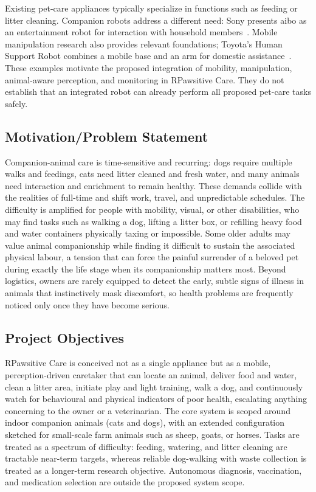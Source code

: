 \documentclass[conference,letterpaper]{IEEEtran}
\begin{document}
Existing pet-care appliances typically specialize in functions such as feeding or litter cleaning. Companion robots address a different need: Sony presents aibo as an entertainment robot for interaction with household members~\cite{sony}. Mobile manipulation research also provides relevant foundations; Toyota's Human Support Robot combines a mobile base and an arm for domestic assistance~\cite{toyota}. These examples motivate the proposed integration of mobility, manipulation, animal-aware perception, and monitoring in RPawsitive Care. They do not establish that an integrated robot can already perform all proposed pet-care tasks safely.

\subsection{Motivation/Problem Statement}

Companion-animal care is time-sensitive and recurring: dogs require multiple walks and feedings, cats need litter cleaned and fresh water, and many animals need interaction and enrichment to remain healthy. These demands collide with the realities of full-time and shift work, travel, and unpredictable schedules. The difficulty is amplified for people with mobility, visual, or other disabilities, who may find tasks such as walking a dog, lifting a litter box, or refilling heavy food and water containers physically taxing or impossible. Some older adults may value animal companionship while finding it difficult to sustain the associated physical labour, a tension that can force the painful surrender of a beloved pet during exactly the life stage when its companionship matters most. Beyond logistics, owners are rarely equipped to detect the early, subtle signs of illness in animals that instinctively mask discomfort, so health problems are frequently noticed only once they have become serious.

\subsection{Project Objectives}

RPawsitive Care is conceived not as a single appliance but as a mobile, perception-driven caretaker that can locate an animal, deliver food and water, clean a litter area, initiate play and light training, walk a dog, and continuously watch for behavioural and physical indicators of poor health, escalating anything concerning to the owner or a veterinarian. The core system is scoped around indoor companion animals (cats and dogs), with an extended configuration sketched for small-scale farm animals such as sheep, goats, or horses. Tasks are treated as a spectrum of difficulty: feeding, watering, and litter cleaning are tractable near-term targets, whereas reliable dog-walking with waste collection is treated as a longer-term research objective. Autonomous diagnosis, vaccination, and medication selection are outside the proposed system scope.
\end{document}
